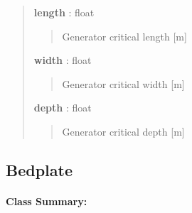 \documentclass[letterpaper,10pt,openany,oneside]{sphinxmanual}
\begin{document}
\begin{fulllineitems}
\begin{quote}
\begin{description}
\textbf{length} : float
\begin{quote}

Generator critical length {[}m{]}
\end{quote}

\textbf{width} : float
\begin{quote}

Generator critical width {[}m{]}
\end{quote}

\textbf{depth} : float
\begin{quote}

Generator critical depth {[}m{]}
\end{quote}

\end{description}\end{quote}

\end{fulllineitems}



\subsection{Bedplate}
\label{documentation:bedplate}\label{documentation:bedplate-class-label}\paragraph{Class Summary:}
\end{document}
